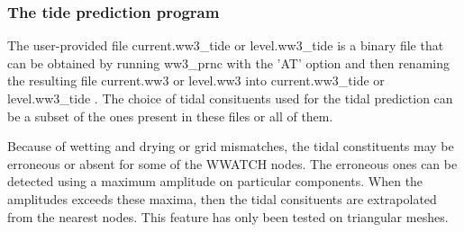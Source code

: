 \vsssub
\subsubsection{The tide prediction program} \label{sub:ww3prtide}
\vsssub


\vspace{\baselineskip}
\noindent
The user-provided file current.ww3\_tide or level.ww3\_tide is a binary file that can be 
obtained by running ww3\_prnc with the 'AT' option and then renaming the resulting file 
current.ww3 or level.ww3 into current.ww3\_tide or level.ww3\_tide . The choice of tidal 
consituents used for the tidal prediction can be a subset of the ones present in these files
or all of them. 

Because of wetting and drying or grid mismatches, the tidal constituents may be erroneous or 
absent for some of the WWATCH nodes. The erroneous ones can be detected using a maximum amplitude 
on particular components. When the amplitudes exceeds these maxima, then the tidal consituents are 
extrapolated from the nearest nodes. This feature has only been tested on triangular meshes. 

\pb
